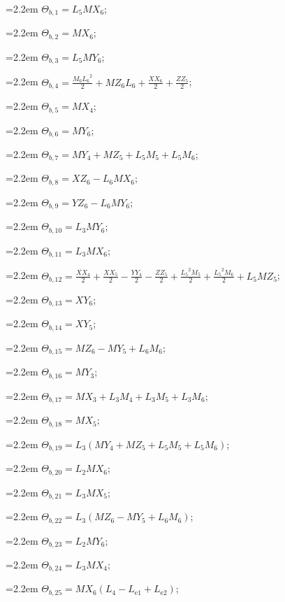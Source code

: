 {\small\setlength{\parindent}{0pt}\raggedright
\hangindent=2.2em $\Theta_{b,1}=L_{5}MX_{6}$;\par
\hangindent=2.2em $\Theta_{b,2}=MX_{6}$;\par
\hangindent=2.2em $\Theta_{b,3}=L_{5}MY_{6}$;\par
\hangindent=2.2em $\Theta_{b,4}=\tfrac{M_{6}{L_{6}}^2}{2}+MZ_{6}L_{6}+\tfrac{XX_{6}}{2}+\tfrac{ZZ_{5}}{2}$;\par
\hangindent=2.2em $\Theta_{b,5}=MX_{4}$;\par
\hangindent=2.2em $\Theta_{b,6}=MY_{6}$;\par
\hangindent=2.2em $\Theta_{b,7}=MY_{4}+MZ_{5}+L_{5}M_{5}+L_{5}M_{6}$;\par
\hangindent=2.2em $\Theta_{b,8}=XZ_{6}-L_{6}MX_{6}$;\par
\hangindent=2.2em $\Theta_{b,9}=YZ_{6}-L_{6}MY_{6}$;\par
\hangindent=2.2em $\Theta_{b,10}=L_{3}MY_{6}$;\par
\hangindent=2.2em $\Theta_{b,11}=L_{3}MX_{6}$;\par
\hangindent=2.2em $\Theta_{b,12}=\tfrac{XX_{4}}{2}+\tfrac{XX_{5}}{2}-\tfrac{YY_{4}}{2}-\tfrac{ZZ_{5}}{2}+\tfrac{{L_{5}}^2M_{5}}{2}+\tfrac{{L_{5}}^2M_{6}}{2}+L_{5}MZ_{5}$;\par
\hangindent=2.2em $\Theta_{b,13}=XY_{6}$;\par
\hangindent=2.2em $\Theta_{b,14}=XY_{5}$;\par
\hangindent=2.2em $\Theta_{b,15}=MZ_{6}-MY_{5}+L_{6}M_{6}$;\par
\hangindent=2.2em $\Theta_{b,16}=MY_{3}$;\par
\hangindent=2.2em $\Theta_{b,17}=MX_{3}+L_{3}M_{4}+L_{3}M_{5}+L_{3}M_{6}$;\par
\hangindent=2.2em $\Theta_{b,18}=MX_{5}$;\par
\hangindent=2.2em $\Theta_{b,19}=L_{3}(MY_{4}+MZ_{5}+L_{5}M_{5}+L_{5}M_{6})$;\par
\hangindent=2.2em $\Theta_{b,20}=L_{2}MX_{6}$;\par
\hangindent=2.2em $\Theta_{b,21}=L_{3}MX_{5}$;\par
\hangindent=2.2em $\Theta_{b,22}=L_{3}(MZ_{6}-MY_{5}+L_{6}M_{6})$;\par
\hangindent=2.2em $\Theta_{b,23}=L_{2}MY_{6}$;\par
\hangindent=2.2em $\Theta_{b,24}=L_{3}MX_{4}$;\par
\hangindent=2.2em $\Theta_{b,25}=MX_{6}(L_{4}-L_{\mathrm{e}1}+L_{\mathrm{e}2})$;\par
}
